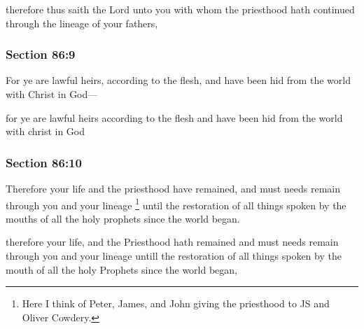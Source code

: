 		\begin{framed}
		\scriptsize
			\begin{compactdesc}
				\item[JSP] therefore thus saith the Lord unto you with whom the priesthood hath continued through the lineage of your fathers,
			\end{compactdesc}
		\end{framed}

	\subsubsection{Section 86:9} %
		\label{DC86-9}

		For ye are lawful heirs, according to the flesh, and have been hid from the world with Christ in God---

		\begin{framed}
		\scriptsize
			\begin{compactdesc}
				\item[JSP] for ye are lawful heirs according to the flesh and have been hid from the world with christ in God
			\end{compactdesc}
		\end{framed}

	\subsubsection{Section 86:10} %
		\label{DC86-10}

		Therefore your life and the priesthood have remained, and must needs remain through you and your lineage%
			\footnote{%
				Here I think of Peter, James, and John giving the priesthood to JS and Oliver Cowdery.
				}
		until the restoration of all things spoken by the mouths of all the holy prophets since the world began.

		\begin{framed}
		\scriptsize
			\begin{compactdesc}
				\item[JSP] therefore your life, and the Priesthood hath remained and must needs remain through you and your lineage untill the restoration of all things spoken by the mouth of all the holy Prophets since the world began,
			\end{compactdesc}
		\end{framed}

